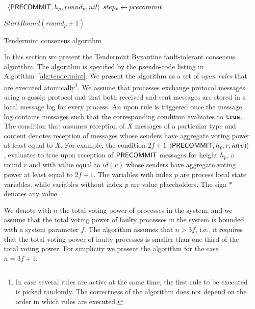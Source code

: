 \begin{algorithm}[htb!]
\begin{algorithmic}[1]
		\SHORTSPACE 
		 \label{line:tab:onTimeoutPrevote} 
			\STATE \Broadcast \ $\langle\mathsf{PRECOMMIT},h_p,round_p,nil\rangle$   
			\label{line:tab:precommit-nil-onTimeout}
			\STATE $step_p \leftarrow precommit$ 
		\ENDIF	
		\ENDFUNCTION
		
		\SHORTSPACE 
		 \label{line:tab:onTimeoutPrecommit} 
			\STATE $StartRound(round_p + 1)$ \label{line:tab:nextRound} 
		\ENDIF
		\ENDFUNCTION	
	\end{algorithmic} \caption{Tendermint consensus algorithm}
	\label{alg:tendermint} 
\end{algorithm}

In this section we present the Tendermint Byzantine fault-tolerant consensus
algorithm. The algorithm is specified by the pseudo-code listing in
Algorithm~\ref{alg:tendermint}. We present the algorithm as a set of \emph{upon
rules} that are executed atomically\footnote{In case several rules are active
at the same time, the first rule to be executed is picked randomly. The
correctness of the algorithm does not depend on the order in which rules are
executed.}. We assume that processes exchange protocol messages using a gossip
protocol and that both received and sent messages are stored in a local message
log for every process. An upon rule is triggered once the message log contains
messages such that the corresponding condition evaluates to $\tt{true}$. The
condition that assumes reception of $X$ messages of a particular type and
content denotes reception of messages whose senders have aggregate voting power at
least equal to $X$. For example, the condition $2f+1$ $\langle\mathsf{PRECOMMIT},h_p,r,id(v)\rangle$,  
evaluates to true upon reception of $\mathsf{PRECOMMIT}$ messages for height $h_p$, 
a round $r$ and with value equal to $id(v)$ whose senders have aggregate voting 
power at least equal to $2f+1$. The variables with index $p$ are process local state
variables, while variables without index $p$ are value placeholders. The sign
$*$ denotes any value.    

We denote with $n$ the total voting power of processes in the system, and we
assume that the total voting power of faulty processes in the system is bounded
with a system parameter $f$.  The algorithm assumes that $n > 3f$, i.e., it
requires that the total voting power of faulty processes is smaller than one
third of the total voting power. For simplicity we present the algorithm for
the case $n = 3f + 1$.


